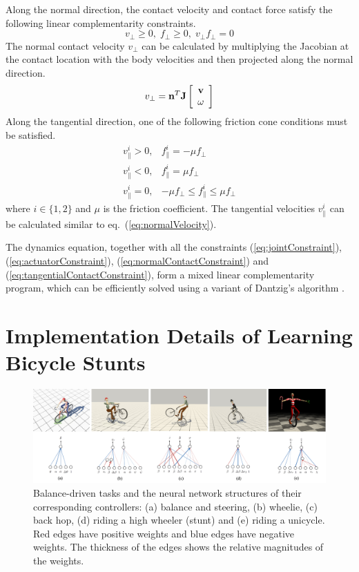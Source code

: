 Along the normal direction, the contact velocity and contact force satisfy the following linear complementarity constraints.
\begin{equation}
v_\perp\geq 0, \; f_\perp \geq 0, \; v_\perp f_\perp =0
\label{eq:normalContactConstraint}
\end{equation}
The normal contact velocity $v_\perp$ can be calculated by multiplying the Jacobian at the contact location with the body velocities and then projected along the normal direction.
\begin{equation}
v_\perp=\mathbf{n}^T\mathbf{J}\left[\begin{array}{c}
\mathbf{v} \\
\mathbf{\omega}
\end{array}\right]
\label{eq:normalVelocity}
\end{equation}
Along the tangential direction, one of the following friction cone conditions must be satisfied.
\begin{equation}
\begin{array}{ll}
v_{\parallel}^i > 0, & f_{\parallel}^i = -\mu f_\perp\\
v_{\parallel}^i < 0, & f_{\parallel}^i = \mu f_\perp\\
v_{\parallel}^i = 0, & -\mu f_\perp \leq f_{\parallel}^i \leq \mu f_\perp
\end{array}
\label{eq:tangentialContactConstraint}
\end{equation}
where $i\in\{1,2\}$ and $\mu$ is the friction coefficient. The tangential velocities $v_{\parallel}^i$ can be calculated similar to eq.~(\ref{eq:normalVelocity}).

The dynamics equation, together with all the constraints (\ref{eq:jointConstraint}), (\ref{eq:actuatorConstraint}), (\ref{eq:normalContactConstraint}) and (\ref{eq:tangentialContactConstraint}), form a mixed linear complementarity program, which can be efficiently solved using a variant of Dantzig's algorithm \cite{ode:2008}.

\chapter{Implementation Details of Learning Bicycle Stunts}
\label{chapter:AppendixC}
\begin{figure}[t]
\centering
\includegraphics[width=\textwidth]{figures/bicycleNeuralNetwork.eps}
  \caption{Balance-driven tasks and the neural network structures of their corresponding controllers: (a) balance and steering, (b) wheelie, (c) back hop, (d) riding a high wheeler (stunt) and (e) riding a unicycle. Red edges have positive weights and blue edges have negative weights. The thickness of the edges shows the relative magnitudes of the weights.}
  \label{fig:neuralnet}
\end{figure}

